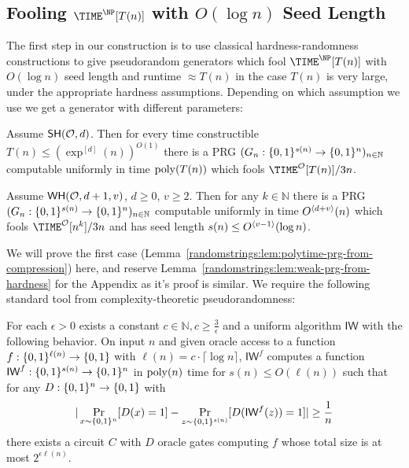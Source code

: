 \subsection{Fooling $\TIME^{\NP}[T(n)]$ with $O(\log n)$ Seed Length}
The first step in our construction is to use classical hardness-randomness constructions to give pseudorandom generators which fool $\TIME^{\NP}[T(n)]$ with $O(\log n)$ seed length and runtime $\approx T(n)$ in the case $T(n)$ is very large, under the appropriate hardness assumptions. Depending on which assumption we use we get a generator with different parameters:

\begin{lemma}\label{randomstrings:lem:polytime-prg-from-compression}
Assume $\mathsf{SH}(\mathcal{O},d)$. Then for every time constructible $T(n) \leq (\exp^{[d]}(n))^{O(1)}$ there is a PRG $(G_n: \{0,1\}^{s(n)} \to \{0,1\}^n)_{n \in \mathbb{N}}$ computable uniformly in time $\mathrm{poly}(T(n))$ which fools $\TIME^{\mathcal{O}}[T(n)]/3n$.
\end{lemma}
\begin{lemma}\label{randomstrings:lem:weak-prg-from-hardness}
Assume $\mathsf{WH}(\mathcal{O},d+1,v)$, $d\geq 0$, $v \geq 2$. Then for any $k\in \mathbb{N}$ there is a PRG $(G_n: \{0,1\}^{s(n)} \to \{0,1\}^n)_{n \in \mathbb{N}}$ computable uniformly in time $O^{\langle d+v \rangle}(n)$ which fools $\TIME^{\mathcal{O}}[n^k]/3n$ and has seed length $s(n) \leq O^{\langle v-1 \rangle}(\log n)$. 
\end{lemma}
We will prove the first case (Lemma~\ref{randomstrings:lem:polytime-prg-from-compression}) here, and reserve Lemma~\ref{randomstrings:lem:weak-prg-from-hardness} for the Appendix as it's proof is similar. We require the following standard tool from complexity-theoretic pseudorandomness:
\begin{theorem}\label{randomstrings:thm:IW-generalized}
For each $\epsilon > 0$ exists a constant $c \in \mathbb{N}, c \geq \frac{3}{\epsilon}$ and a uniform algorithm $\mathsf{IW}$ with the following behavior. On input $n$ and given oracle access to a function $f: \{0,1\}^{\ell(n)} \to \{0,1\}$ with $\ell(n) = c \cdot \lceil \log n \rceil $, $\mathsf{IW}^f$ computes a function $\mathsf{IW}^f: \{0,1\}^{s(n)} \to \{0,1\}^n$ in $\mathrm{poly}(n)$ time for $s(n) \leq O(\ell(n))$ such that for any $D: \{0,1\}^n \to \{0,1\}$ with
\[
|\Pr_{x \sim \{0,1\}^n}[ D(x) = 1] - \Pr_{z \sim \{0,1\}^{s(n)}}[D(\mathsf{IW}^f(z)) = 1]| \geq \frac{1}{n}
\]
there exists a circuit $C$ with $D$ oracle gates computing $f$ whose total size is at most $2^{\epsilon \ell(n)}$.
\end{theorem}


